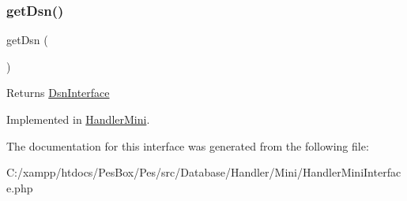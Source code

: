 \subsubsection{\texorpdfstring{get\+Dsn()}{getDsn()}}
{\footnotesize\ttfamily get\+Dsn (\begin{DoxyParamCaption}{ }\end{DoxyParamCaption})}

\begin{DoxyReturn}{Returns}
\mbox{\hyperlink{interface_pes_1_1_database_1_1_handler_1_1_mini_1_1_dsn_interface}{Dsn\+Interface}} 
\end{DoxyReturn}


Implemented in \mbox{\hyperlink{class_pes_1_1_database_1_1_handler_1_1_mini_1_1_handler_mini_a4a0bf8061a4ee59b487f17625cb37e13}{Handler\+Mini}}.



The documentation for this interface was generated from the following file\+:\begin{DoxyCompactItemize}
\item 
C\+:/xampp/htdocs/\+Pes\+Box/\+Pes/src/\+Database/\+Handler/\+Mini/Handler\+Mini\+Interface.\+php\end{DoxyCompactItemize}
